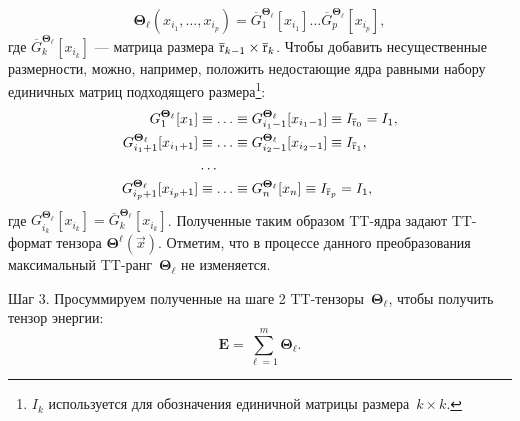 \begin{equation}
\label{energy:tt-for-partial-potential}
\mathbf{\Theta}_\ell(x_{i_1}, \ldots, x_{i_p}) = \overline{G}^{\mathbf{\Theta}_\ell}_1[x_{i_1}] \ldots \overline{G}^{\mathbf{\Theta}_\ell}_p[x_{i_p}],
\end{equation}
где $\overline{G}^{\mathbf{\Theta}_\ell}_k[x_{i_k}]$ --- матрица размера $\overline{\operatorname{r}}_{k-1} \times \overline{\operatorname{r}}_k$. Чтобы добавить несущественные размерности, можно, например, положить недостающие ядра равными набору единичных матриц подходящего размера\footnote{$I_k$ используется для обозначения единичной матрицы размера~$k \times k$.}:
\begin{equation*}
\begin{aligned}
G^{\mathbf{\Theta}_\ell}_1[x_1] &\equiv  \ldots \equiv G^{\mathbf{\Theta}_\ell}_{i_1 - 1}[x_{i_1 - 1}] \equiv I_{\overline{\operatorname{r}}_0} = I_1,\\
G^{\mathbf{\Theta}_\ell}_{i_1 + 1}[x_{i_1 + 1}] &\equiv \ldots \equiv G^{\mathbf{\Theta}_\ell}_{i_2 - 1}[x_{i_2 - 1}] \equiv I_{\overline{\operatorname{r}}_1},\\
&\ldots\\
G^{\mathbf{\Theta}_\ell}_{i_p + 1}[x_{i_p + 1}] &\equiv \ldots \equiv G^{\mathbf{\Theta}_\ell}_{n}[x_{n}] \equiv I_{\overline{\operatorname{r}}_p} = I_1,
\end{aligned}
\end{equation*}
где $G^{\mathbf{\Theta}_\ell}_{i_k}[x_{i_k}] = \overline{G}^{\mathbf{\Theta}_\ell}_{k}[x_{i_k}]$. Полученные таким образом TT\hyp{}ядра задают TT\hyp{}формат тензора $\mathbf{\Theta}^\ell(\vec{x})$.
Отметим, что в процессе данного преобразования максимальный TT\hyp{}ранг~$\mathbf{\Theta}_\ell$ не изменяется.

Шаг 3. Просуммируем полученные на шаге 2 TT\hyp{}тензоры~$\mathbf{\Theta}_\ell$, чтобы получить тензор энергии:
\begin{equation}
\label{energy:energy-tensor-as-sum-of-potential-tensors}
\mathbf{E} = \sum_{\ell=1}^m \mathbf{\Theta}_\ell.
\end{equation}

